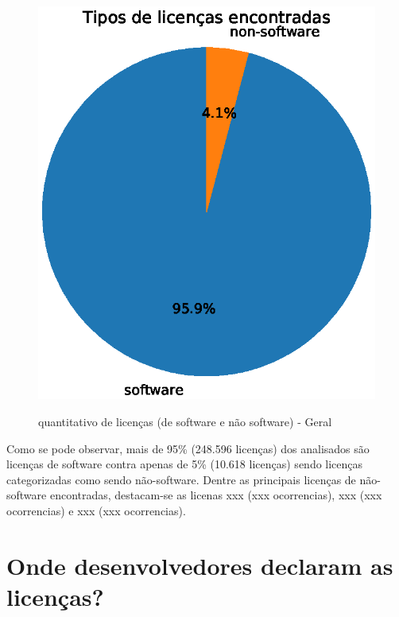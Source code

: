 \begin{figure}[H]
    \centering
    \caption{quantitativo de licenças (de software e não software) - Geral}
    \includegraphics[scale=0.8]{figuras/resultados/tipos_licenca.eps}
    \label{local-licencas-raiz}
\end{figure}

Como se pode observar,  mais de 95\% (248.596 licenças) dos analisados são licenças de software contra apenas de 5\% (10.618 licenças) sendo licenças categorizadas como sendo não-software. Dentre as principais licenças de não-software encontradas, destacam-se as licenas xxx (xxx ocorrencias), xxx (xxx ocorrencias) e xxx (xxx ocorrencias). 


\section{Onde desenvolvedores declaram as licenças?}


